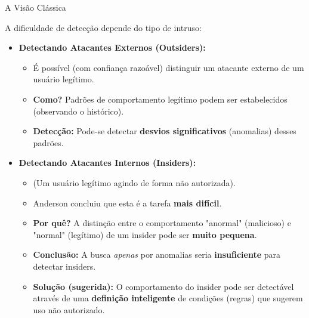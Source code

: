 \begin{frame}{A Visão Clássica}

    A dificuldade de detecção depende do tipo de intruso:
    \begin{itemize}


        \item \textbf{Detectando Atacantes Externos (Outsiders):}
              \begin{itemize}
                  \item É possível (com confiança razoável) distinguir um atacante externo de um usuário legítimo.
                  \item \textbf{Como?} Padrões de comportamento legítimo podem ser estabelecidos (observando o histórico).
                  \item \textbf{Detecção:} Pode-se detectar \textbf{desvios significativos} (anomalias) desses padrões.
              \end{itemize}

        \item \textbf{Detectando Atacantes Internos (Insiders):}
              \begin{itemize}
                  \item (Um usuário legítimo agindo de forma não autorizada).
                  \item Anderson concluiu que esta é a tarefa \textbf{mais difícil}.
                  \item \textbf{Por quê?} A distinção entre o comportamento "anormal" (malicioso) e "normal" (legítimo) de um insider pode ser \textbf{muito pequena}.
                  \item \textbf{Conclusão:} A busca \textit{apenas} por anomalias seria \textbf{insuficiente} para detectar insiders.
                  \item \textbf{Solução (sugerida):} O comportamento do insider pode ser detectável através de uma \textbf{definição inteligente} de condições (regras) que sugerem uso não autorizado.
              \end{itemize}
    \end{itemize}
\end{frame}

